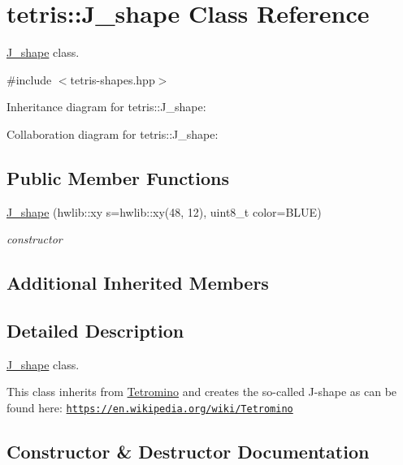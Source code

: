 \hypertarget{classtetris_1_1J__shape}{}\section{tetris\+:\+:J\+\_\+shape Class Reference}
\label{classtetris_1_1J__shape}


\hyperlink{classtetris_1_1J__shape}{J\+\_\+shape} class.  




{\ttfamily \#include $<$tetris-\/shapes.\+hpp$>$}



Inheritance diagram for tetris\+:\+:J\+\_\+shape\+:


Collaboration diagram for tetris\+:\+:J\+\_\+shape\+:
\subsection*{Public Member Functions}
\begin{DoxyCompactItemize}
\item 
\hyperlink{classtetris_1_1J__shape_a57df6be9d1328c536faa1e2b46adf239}{J\+\_\+shape} (hwlib\+::xy s=hwlib\+::xy(48, 12), uint8\+\_\+t color=B\+L\+UE)
\begin{DoxyCompactList}\small\item\em constructor \end{DoxyCompactList}\end{DoxyCompactItemize}
\subsection*{Additional Inherited Members}


\subsection{Detailed Description}
\hyperlink{classtetris_1_1J__shape}{J\+\_\+shape} class. 

This class inherits from \hyperlink{classtetris_1_1Tetromino}{Tetromino} and creates the so-\/called J-\/shape as can be found here\+: \href{https://en.wikipedia.org/wiki/Tetromino}{\tt https\+://en.\+wikipedia.\+org/wiki/\+Tetromino} 

\subsection{Constructor \& Destructor Documentation}
\mbox{\label{classtetris_1_1J__shape_a57df6be9d1328c536faa1e2b46adf239}} 
